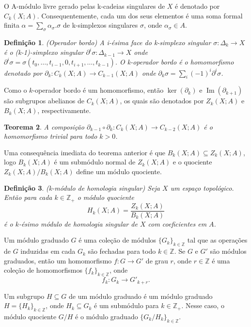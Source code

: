 \documentclass[12pt]{book}
\newtheorem{teorema}{Teorema}[section]
\newtheorem{definicao}[teorema]{Definição}
\DeclareMathOperator{\Ima}{Im}
\newcommand{\bordo}[1]{\partial_{#1}}
\newcommand{\cadeia}[2]{C_{#1}(#2; A)}
\newcommand{\colecao}[1]{\{#1_{k} \}_{k\in \inteiros}}
\newcommand{\homologia}[2]{H_{#1}(#2;A)}
\newcommand{\imagem}[1]{\Ima(#1)}
\newcommand{\imagembordo}[2]{B_{#1}(#2;A)}
\newcommand{\inteiros}{\mathbb{Z}}
\newcommand{\inteirospos}{\inteiros_{+}}
\newcommand{\kernelbordo}[2]{Z_{#1}(#2;A)}
\begin{document}
	O A-módulo livre gerado pelas k-cadeias singulares de $X$ é denotado por $\cadeia{k}{X}$. Consequentemente, cada um dos seus elementos é uma soma formal finita $\alpha = \sum_{\sigma} \alpha_{\sigma}.\sigma $ de k-simplexos singulares $\sigma$, onde $\alpha_{\sigma} \in A$.
	
	\begin{definicao}
		(Operador bordo) A i-ésima face do k-simplexo singular $\sigma: \Delta_{k} \to X$ é o (k-1)-simplexo singular $\partial^{i}\sigma:\Delta_{k-1} \to X$ onde $\partial^{i}\sigma = \sigma(t_{0}, \dots, t_{i-1},0,t_{i+1}, \dots, t_{k-1})$. O k-operador bordo é o homomorfismo denotado por $\bordo{k}: \cadeia{k}{X} \to \cadeia{k-1}{X}$ onde $\bordo{k}\sigma = \sum_{i} (-1)^{i}\partial^{i}\sigma$.
	\end{definicao}
	
	Como o $k$-operador bordo é um homomorfismo, então $\ker(\bordo{k})$ e $\imagem{\bordo{k+1}}$ são subgrupos abelianos de $\cadeia{k}{X}$, os quais são denotados por $\kernelbordo{k}{X}$ e $\imagembordo{k}{X}$, respectivamente.
	
	\begin{teorema}
		A composição $\bordo{k-1}\circ\bordo{k}: \cadeia{k}{X} \to \cadeia{k-2}{X}$ é o homomorfismo trivial para todo $k>0$.
	\end{teorema}
	
	Uma consequência imediata do teorema anterior é que $\imagembordo{k}{X} \subseteq \kernelbordo{k}{X}$, logo $\imagembordo{k}{X}$ é um submódulo normal de $\kernelbordo{k}{X}$ e o quociente $\kernelbordo{k}{X}/\imagembordo{k}{X}$ define um módulo quociente.
	
	\begin{definicao}
		(k-módulo de homologia singular) Seja $X$ um espaço topológico. Então para cada $k \in \inteirospos$ o módulo quociente
		$$
		\homologia{k}{X} = \frac{\kernelbordo{k}{X}}{\imagembordo{k}{X}}
		$$
		é o $k$-ésimo módulo de homologia singular de $X$ com coeficientes em $A$.
	\end{definicao}
	
	Um módulo graduado $G$ é uma coleção de módulos $\colecao{G}$ tal que as operações de $G$ induzidas em cada $G_{k}$ são fechadas para todo $k \in \inteiros$. Se $G$ e $G'$ são módulos graduados, então um homomorfismo $f:G\to G'$ de grau $r$, onde $r \in \inteiros$ é uma coleção de homomorfismos $\colecao{f}$, onde 
	$$
	f_{k}:G_{k}\to G'_{k+r}.
	$$
	
	Um subgrupo $H\subseteq G$ de um módulo graduado é um módulo graduado $H=\colecao{H}$, onde $H_{k} \subseteq G_{k}$ é um submódulo para $k \in \inteiros_{+}$. Nesse caso, o módulo quociente $G/H$ é o módulo graduado $\{G_{k}/H_{k} \}_{k\in \inteiros}$.
	
\end{document}
